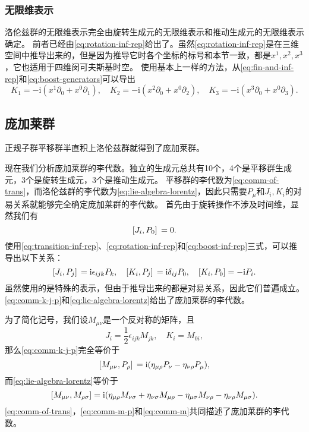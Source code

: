 \documentclass[hyperref, UTF8, a4paper]{ctexart}
\newcommand*{\ii}{\mathrm{i}}
\begin{document}
\subsubsection{无限维表示}

洛伦兹群的无限维表示完全由旋转生成元的无限维表示和推动生成元的无限维表示确定。
前者已经由\eqref{eq:rotation-inf-rep}给出了。虽然\eqref{eq:rotation-inf-rep}是在三维空间中推导出来的，但是因为推导它时各个坐标的标号和本节一致，都是$x^1, x^2, x^3$，它也适用于四维闵可夫斯基时空。
使用基本上一样的方法，从\eqref{eq:fin-and-inf-rep}和\eqref{eq:boost-generators}可以导出
\begin{equation}
    K_1 = - \ii (x^1 \partial_0 + x^0 \partial_1), \quad K_2 = - \ii (x^2 \partial_0 + x^0 \partial_2), \quad K_3 = - \ii (x^3 \partial_0 + x^0 \partial_3).
    \label{eq:boost-inf-rep}
\end{equation}

\subsection{庞加莱群}

正规子群平移群半直积上洛伦兹群就得到了庞加莱群。

现在我们分析庞加莱群的李代数。独立的生成元总共有10个，4个是平移群生成元，3个是旋转生成元，3个是推动生成元。
平移群的李代数为\eqref{eq:comm-of-trans}，而洛伦兹群的李代数为\eqref{eq:lie-algebra-lorentz}，因此只需要$P_\mu$和$J_i,K_i$的对易关系就能够完全确定庞加莱群的李代数。
首先由于旋转操作不涉及时间维，显然我们有
\begin{equation}
    \comm*{J_i}{P_0} = 0.
\end{equation}
使用\eqref{eq:transition-inf-rep}、\eqref{eq:rotation-inf-rep}和\eqref{eq:boost-inf-rep}三式，可以推导出以下关系：
\begin{equation}
    \comm*{J_i}{P_j} = \ii \epsilon_{ijk} P_k, \quad \comm*{K_i}{P_j} = \ii \delta_{ij} P_0, \quad \comm{K_i}{P_0} = - \ii P_i.
    \label{eq:comm-k-j-p}
\end{equation}
虽然使用的是特殊的表示，但由于推导出来的都是对易关系，因此它们普遍成立。
\eqref{eq:comm-k-j-p}和\eqref{eq:lie-algebra-lorentz}给出了庞加莱群的李代数。

为了简化记号，我们设$M_{\mu \nu}$是一个反对称的矩阵，且
\begin{equation}
    J_i = \frac{1}{2} \epsilon_{ijk} M_{jk}, \quad K_i = M_{0i},
\end{equation}
那么\eqref{eq:comm-k-j-p}完全等价于
\begin{equation}
    \comm*{M_{\mu \nu}}{P_\rho} = \ii (\eta_{\mu \rho} P_\nu - \eta_{\nu \rho} P_\mu),
    \label{eq:comm-m-p}
\end{equation}
而\eqref{eq:lie-algebra-lorentz}等价于
\begin{equation}
    \comm{M_{\mu \nu}}{M_{\rho \sigma}}  = \ii (\eta_{\mu \rho} M_{\nu \sigma} + \eta_{\nu \sigma} M_{\mu \rho} - \eta_{\mu \sigma} M_{\nu \rho} - \eta_{\nu \rho} M_{\mu \sigma}).
    \label{eq:comm-m}
\end{equation}
\eqref{eq:comm-of-trans}，\eqref{eq:comm-m-p}和\eqref{eq:comm-m}共同描述了庞加莱群的李代数。
\end{document}
